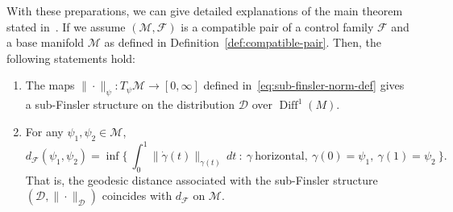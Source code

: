 \documentclass[12pt]{amsart}
\numberwithin{equation}{section}
\newtheorem{theorem}{Theorem}[section]
\theoremstyle{remark}
\begin{document}
With these preparations, we can give detailed explanations of the main theorem stated in~.
If we assume $(\mathcal M, \mathcal F)$ is a compatible pair of a control family $\mathcal F$ and a base manifold $\mathcal M$ as defined in Definition~\ref{def:compatible-pair}.
Then, the following statements hold:
\begin{enumerate}
\item The maps $\|\cdot\|_{ \psi}: T_\psi\mathcal M\to[0,\infty]$ defined in~\eqref{eq:sub-finsler-norm-def} gives a sub-Finsler structure  on the distribution $\mathcal D$ over $\operatorname{Diff}^{1}(M)$. 
\item  For any $\psi_1,\psi_2\in\mathcal M$,
\begin{equation}
  \label{eq:CC_dist}
d_{\mathcal F}(\psi_1,\psi_2)=\inf\Big\{\ \int_0^1 \|\dot\gamma(t)\|_{\gamma(t)}\,dt\ :\ \gamma\ \text{horizontal},\ \gamma(0)=\psi_1,\ \gamma(1)=\psi_2\ \Big\}.
\end{equation}
That is, the geodesic distance associated with the sub-Finsler structure $(\mathcal D,\|\cdot\|_{\mathcal D})$ coincides with $d_{\mathcal F}$ on $\mathcal M$.

\end{enumerate}
\end{document}
